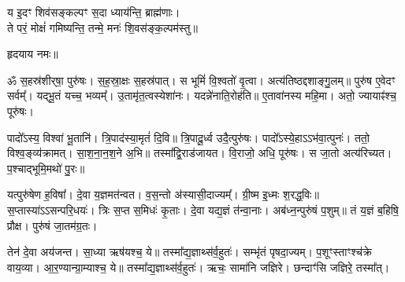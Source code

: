\begin{center}






य इ॒दꣳ शिव॑सङ्कल्पꣳ स॒दा ध्याय॑न्ति॒ ब्राह्म॑णाः।\\
 ते परं॒ मोक्षं॑ गमिष्यन्ति॒ तन्मे॒ मनः॑ शि॒वस॑ङ्क॒ल्पम॑स्तु॥

हृदयाय नमः॥
\end{center}
{\small \closesection}

ॐ स॒हस्र॑शीर्‌षा॒ पुरु॑षः। स॒ह॒स्रा॒क्षः स॒हस्र॑पात्। स भूमिं॑ वि॒श्वतो॑ वृ॒त्वा। अत्य॑तिष्ठद्दशाङ्गु॒लम्॥ पुरु॑ष ए॒वेदꣳ सर्वम्᳚। यद्भू॒तं यच्च॒ भव्यम्᳚। उ॒तामृ॑त॒त्वस्येशा॑नः। यदन्ने॑नाति॒रोह॑ति॥ ए॒तावा॑नस्य महि॒मा। अतो॒ ज्यायाꣴ॑श्च॒ पूरु॑षः।

 पादो᳚ऽस्य॒ विश्वा॑ भू॒तानि॑। त्रि॒पाद॑स्या॒मृतं॑ दि॒वि॥ त्रि॒पादू॒र्ध्व उदै॒त्पुरु॑षः। पादो᳚ऽस्ये॒हाऽऽभ॑वा॒त्पुनः॑। ततो॒ विश्व॒ङ्व्य॑क्रामत्। सा॒श॒ना॒न॒श॒ने अ॒भि॥ तस्मा᳚द्वि॒राड॑जायत। वि॒राजो॒ अधि॒ पूरु॑षः। स जा॒तो अत्य॑रिच्यत। प॒श्चाद्भूमि॒मथो॑ पु॒रः॥

 यत्पुरु॑षेण ह॒विषा᳚। दे॒वा य॒ज्ञमत॑न्वत। व॒स॒न्तो अ॑स्यासी॒दाज्यम्᳚। ग्री॒ष्म इ॒ध्मः श॒रद्ध॒विः॥ स॒प्तास्या॑ऽऽ\-सन्परि॒धयः॑। त्रिः स॒प्त स॒मिधः॑ कृ॒ताः। दे॒वा यद्य॒ज्ञं त॑न्वा॒नाः। अब॑ध्न॒न्पुरु॑षं प॒शुम्॥ तं य॒ज्ञं ब॒\ar हिषि॒ प्रौक्ष\sn। पुरु॑षं जा॒तम॑ग्र॒तः।

 तेन॑ दे॒वा अय॑जन्त। सा॒ध्या ऋष॑यश्च॒ ये॥ तस्मा᳚द्य॒ज्ञाथ्स॑र्व॒\-हुतः॑। सम्भृ॑तं पृषदा॒ज्यम्। प॒शूꣳस्ताꣳश्च॑क्रे वाय॒व्या\sn{}। आ॒र॒ण्यान्ग्रा॒म्याश्च॒ ये॥ तस्मा᳚द्य॒ज्ञाथ्स॑र्व॒हुतः॑। ऋचः॒ सामा॑नि जज्ञिरे। छन्दाꣳ॑सि जज्ञिरे॒ तस्मा᳚त्।

